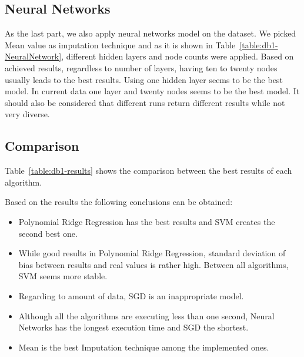 \subsection{Neural Networks}
As the last part, we also apply neural networks model on the dataset. We picked Mean value as imputation technique and as it is shown in Table~\ref{table:db1-NeuralNetwork}, different hidden layers and node counts were applied. Based on achieved results, regardless to number of layers, having ten to twenty nodes usually leads to the best results. Using one hidden layer seems to be the best model. In current data one layer and twenty nodes seems to be the best model. It should also be considered that different runs return different results while not very diverse.

\subsection{Comparison}
Table~\ref{table:db1-results} shows the comparison between the best results of each algorithm.

Based on the results the following conclusions can be obtained:
\begin{itemize}
  \item Polynomial Ridge Regression has the best results and SVM creates the second best one.
  \item While good results in Polynomial Ridge Regression, standard deviation of bias between results and real values is rather high. Between all algorithms, SVM seems more stable.
  \item Regarding to amount of data, SGD is an inappropriate model.
  \item Although all the algorithms are executing less than one second, Neural Networks has the longest execution time and SGD the shortest.
  \item Mean is the best Imputation technique among the implemented ones.
\end{itemize}

